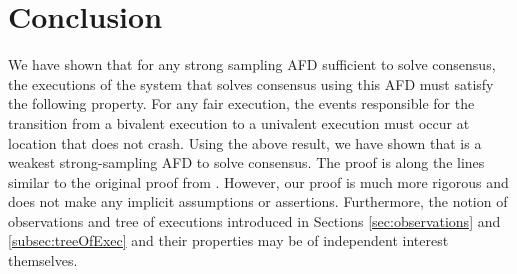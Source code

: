 \documentclass[11pt]{article}
\numberwithin{theorem}{section}
\begin{document}
 

\section{Conclusion}\label{sec:conclusion}

We have shown that for any strong sampling AFD sufficient to solve consensus, the executions of the system that solves consensus using this AFD must satisfy the following property. For any fair execution, the events responsible for the transition from a bivalent execution to a univalent execution must occur at location that does not crash.
Using the above result, we have shown that  is a weakest strong-sampling AFD to solve consensus. The proof is along the lines similar to the original proof from \cite{chan:twfdf}. However, our proof is much more rigorous and does not make any implicit assumptions or assertions. Furthermore, the notion of observations and tree of executions introduced in Sections \ref{sec:observations}  and \ref{subsec:treeOfExec} and their properties may be of independent interest themselves.



\end{document}
